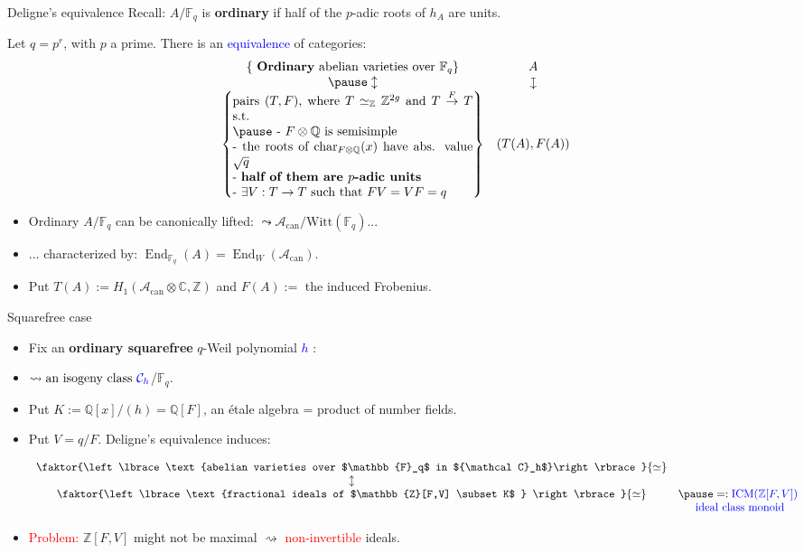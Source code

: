 \documentclass[usenames,dvipsnames,handout]{beamer}
\def\Q{\mathbb{Q}}
\def\Z{\mathbb{Z}}
\def\C{\mathbb{C}}
\def\F{\mathbb{F}}
\DeclareMathOperator{\Char}{char}
\DeclareMathOperator{\ICM}{ICM}
\DeclareMathOperator{\End}{End}
\newcommand{\cA}{{\mathcal A}}
\newcommand{\cC}{{\mathcal C}}
\newcommand{\downmapsto}{\rotatebox[origin=c]{-90}{$\large\mapsto$}\mkern2mu} %
\newcommand{\set}[1]{\left\lbrace#1\right\rbrace }
\newcommand{\red}[1]{\textcolor{red}{#1}}
\newcommand{\blue}[1]{\textcolor{blue}{#1}}
\begin{document}
\begin{frame}{ Deligne's equivalence }
	Recall: $A/\F_q$ is {\bf ordinary} if half of the $p$-adic roots of $h_A$ are units.
\pause
	\begin{theorem}[Deligne '69]
	Let $q=p^r$, with $p$ a prime.
	There is an \blue{equivalence} of categories:
	\[ \begin{array}{cc}
	\set{\text{ {\bf Ordinary} abelian varieties over } \F_q } 	& A \\
\pause
    \updownarrow											& \downmapsto \\
	\set{\parbox[p]{19em}{pairs $(T,F)$, where $T\simeq_\Z \Z^{2g}$ and $T\overset{F}{\to} T$ s.t.\\
\pause
	- $F\otimes \Q$ is semisimple\\
	- the roots of $\Char_{F\otimes\Q}(x)$ have abs. value $\sqrt{q}$\\
	- \textbf{half of them are $p$-adic units}\\
	- $\exists V:T\to T$ such that $FV=VF=q$
	}}	& (T(A),F(A))
	\end{array} \]
	\end{theorem}
\pause
	\begin{itemize}
	 \item Ordinary $A/\F_q$ can be canonically lifted: $\leadsto \cA_{\mathrm{can}}/\mathrm{Witt}(\F_q)$...
\pause
	 \item ... characterized by: $\End_{\F_q}(A) = \End_W(\cA_{\mathrm{can}})$.
\pause
	 \item Put $T(A):=H_1(\cA_{\mathrm{can}}\otimes \C,\Z) $
\pause
	  and $F(A):=$ the induced Frobenius.
	\end{itemize}
\end{frame}

\begin{frame}{Squarefree case}
	\begin{itemize}
	\item Fix an \textbf{ordinary squarefree} $q$-Weil polynomial \blue{$h$} :
\pause  
    \item  $\rightsquigarrow \text{an isogeny class } \blue{\cC_h}$/$\F_q$.
\pause 
    \item Put $K := \Q[x]/(h)=\Q[F]$, an \'etale algebra = product of number fields.
\pause
	\item Put $V=q/F$. Deligne's equivalence induces:
\pause
			\begin{theorem}
			\[\begin{array}{cc}
			\faktor{\set{\text{abelian varieties over $\F_q$ in $\cC_h$}}}{\simeq} & \\
			\updownarrow & \\
			\faktor{\set{ \text{fractional ideals of $\Z[F,V] \subset K$ } }}{\simeq} &
\pause =:  \blue{\ICM(\Z[F,V])}\\ 
			& \blue{\text{ ideal class monoid} }
			  \end{array}\]
			\end{theorem}
\pause
    \item \red{Problem:} $\Z[F,V]$ might not be maximal $\rightsquigarrow $ \red{non-invertible} ideals.
	\end{itemize}
\end{frame}
\end{document}
